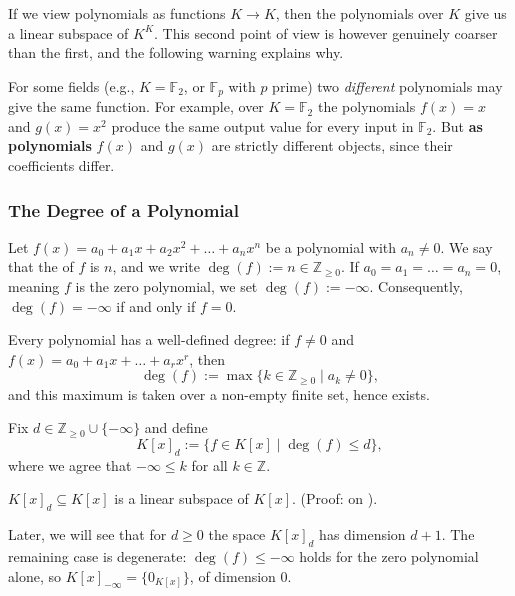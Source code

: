 If we view polynomials as functions $K \to K$, then the polynomials over $K$ give us a linear subspace of $K^K$. This second point of view is however genuinely coarser than the first, and the following warning explains why.

\begin{importantremark}
\label{rem:polynomial_vs_function}
For some fields (e.g., $K = \mathbb{F}_2$, or $\mathbb{F}_p$ with $p$ prime) two \emph{different} polynomials may give the same function. For example, over $K = \mathbb{F}_2$ the polynomials $f(x) = x$ and $g(x) = x^2$ produce the same output value for every input in $\mathbb{F}_2$. But \textbf{as polynomials} $f(x)$ and $g(x)$ are strictly different objects, since their coefficients differ.
\end{importantremark}

\subsubsection{The Degree of a Polynomial}

Let $f(x) = a_0 + a_1 x + a_2 x^2 + \dots + a_n x^n$ be a polynomial with $a_n \ne 0$. We say that the  of $f$ is $n$, and we write $\deg(f) := n \in \mathbb{Z}_{\ge 0}$. If $a_0 = a_1 = \dots = a_n = 0$, meaning $f$ is the zero polynomial, we set $\deg(f) := -\infty$. Consequently, $\deg(f) = -\infty$ if and only if $f = 0$.

\begin{remark}
Every polynomial has a well-defined degree: if $f \ne 0$ and $f(x) = a_0 + a_1 x + \dots + a_r x^r$, then
\[
\deg(f) := \max \{k \in \mathbb{Z}_{\ge 0} \mid a_k \ne 0\},
\]
and this maximum is taken over a non-empty finite set, hence exists.
\end{remark}

\begin{example}
\label{ex:bounded_degree_subspace}
Fix $d \in \mathbb{Z}_{\ge 0} \cup \{-\infty\}$ and define
\[
K[x]_d := \{f \in K[x] \mid \deg(f) \le d\},
\]
where we agree that $-\infty \le k$ for all $k \in \mathbb{Z}$.

\begin{claim*}[{$K[x]_d$ is a subspace}]
\label{claim:bounded_degree_subspace}
$K[x]_d \subseteq K[x]$ is a linear subspace of $K[x]$. (Proof: on ).
\end{claim*}

Later, we will see that for $d \ge 0$ the space $K[x]_d$ has dimension $d+1$. The remaining case is degenerate: $\deg(f) \le -\infty$ holds for the zero polynomial alone, so $K[x]_{-\infty} = \{0_{K[x]}\}$, of dimension $0$.
\end{example}

